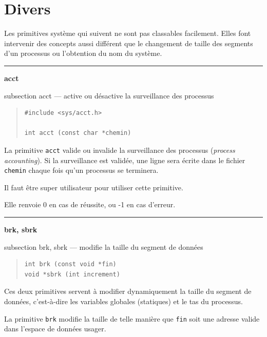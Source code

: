 \documentclass [twoside] {report}
\newcommand {\primitive} [1]
    {
	\phantomsection
	{\large \textbf {#1}}
	\addcontentsline {toc} {subsection} {#1}
    }
\newcommand {\separation}
    {
	\vspace {5mm}
	\nopagebreak
	\hrule
    }
\begin{document}

\section {Divers}


Les primitives système qui suivent ne sont pas
classables facilement. Elles font intervenir des
concepts aussi différent que le changement de
taille des segments d'un processus ou l'obtention
du nom du système.




\separation
\primitive {acct} --- active ou désactive la surveillance des processus

\begin {quote}
\begin {verbatim}
#include <sys/acct.h>

int acct (const char *chemin)
\end{verbatim}
\end {quote}

La primitive \texttt {acct} valide ou invalide la
surveillance des processus (\textit {process
accounting}). Si la surveillance est validée, une
ligne sera écrite dans le fichier \texttt {chemin} chaque
fois qu'un processus se terminera.

Il faut être super utilisateur pour utiliser cette
primitive.

Elle renvoie 0 en cas de réussite, ou
-1 en cas d'erreur.




\separation
\primitive {brk, sbrk} --- modifie la taille du segment de données

\begin {quote}
\begin {verbatim}
int brk (const void *fin)
void *sbrk (int increment)
\end{verbatim}
\end {quote}

Ces deux primitives servent à modifier dynamiquement la taille du
segment de données, c'est-à-dire les variables globales (statiques) et
le tas du processus.

La primitive \texttt {brk} modifie la taille de telle manière que \texttt {fin}
soit une adresse valide dans l'espace de données usager.
\end{document}
